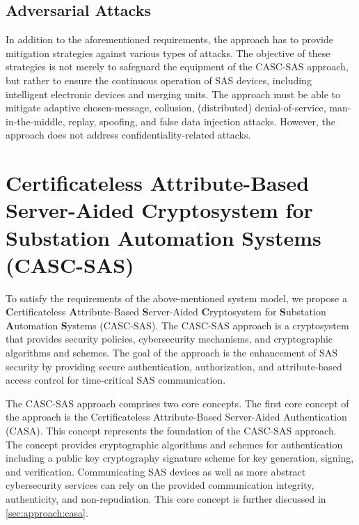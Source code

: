\subsection{Adversarial Attacks}
In addition to the aforementioned requirements, the approach has to provide mitigation strategies against various types of attacks.
The objective of these strategies is not merely to safeguard the equipment of the CASC-SAS approach, but rather to ensure the continuous operation of SAS devices, including intelligent electronic devices and merging units.
The approach must be able to mitigate adaptive chosen-message, collusion, (distributed) denial-of-service, man-in-the-middle, replay, spoofing, and false data injection attacks.
However, the approach does not address confidentiality-related attacks.

\section[Certificateless Attribute-Based Server-Aided Cryptosystem for SAS (CASC-SAS)]{Certificateless Attribute-Based Server-Aided Cryptosystem for Substation Automation Systems (CASC-SAS)}
\label{sec:approach:casc}
To satisfy the requirements of the above-mentioned system model, we propose a \textbf{C}ertificateless \textbf{A}ttribute-Based \textbf{S}erver-Aided \textbf{C}ryptosystem for \textbf{S}ubstation \textbf{A}utomation \textbf{S}ystems (CASC-SAS).
The CASC-SAS approach is a cryptosystem that provides security policies, cybersecurity mechanisms, and cryptographic algorithms and schemes.
The goal of the approach is the enhancement of SAS security by providing secure authentication, authorization, and attribute-based access control for time-critical SAS communication.

The CASC-SAS approach comprises two core concepts.
The first core concept of the approach is the Certificateless Attribute-Based Server-Aided Authentication (CASA).
This concept represents the foundation of the CASC-SAS approach.
The concept provides cryptographic algorithms and schemes for authentication including a public key cryptography signature scheme for key generation, signing, and verification.
Communicating SAS devices as well as more abstract cybersecurity services can rely on the provided communication integrity, authenticity, and non-repudiation.
This core concept is further discussed in \autoref{sec:approach:casa}.

